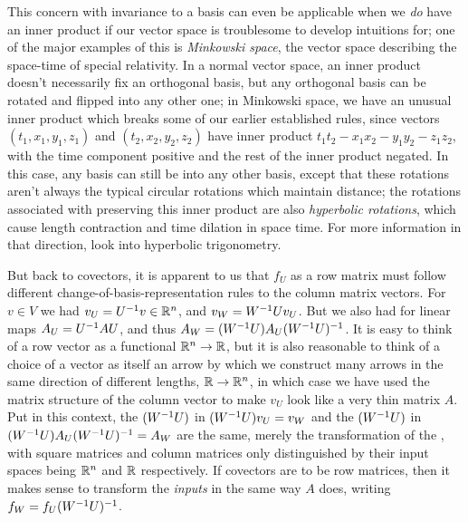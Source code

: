 \documentclass[11pt]{article}
\begin{document}
This concern with invariance to a basis can even be applicable when we \emph{do} have an inner product if our vector space is troublesome to develop intuitions for; one of the major examples of this is \emph{Minkowski space}, the vector space describing the space-time of special relativity. In a normal vector space, an inner product doesn't necessarily fix an orthogonal basis, but any orthogonal basis can be rotated and flipped into any other one; in Minkowski space, we have an unusual inner product which breaks some of our earlier established rules, since vectors $(t_1,x_1,y_1,z_1)$ and $(t_2,x_2,y_2,z_2)$ have inner product $t_1 t_2 - x_1 x_2 - y_1 y_2 - z_1 z_2$, with the time component positive and the rest of the inner product negated. In this case, any basis can still be  into any other basis, except that these rotations aren't always the typical circular rotations which maintain distance; the rotations associated with preserving this inner product are also \emph{hyperbolic rotations}, which cause length contraction and time dilation in space time. For more information in that direction, look into hyperbolic trigonometry.

But back to covectors, it is apparent to us that $f_U$ as a row matrix must follow different change-of-basis-representation rules to the column matrix vectors. For $v \in V$ we had $v_U = U^{-1} v \in \mathbb{R}^n$, and $v_W = W^{-1} U v_U$. But we also had for linear maps $A_U = U^{-1} A U$, and thus $A_W = (W^{-1} U) A_U (W^{-1} U)^{-1}$. It is easy to think of a row vector as a functional $\mathbb{R}^n \to \mathbb{R}$, but it is also reasonable to think of a choice of a vector as itself an arrow by which we construct many arrows in the same direction of different lengths, $\mathbb{R} \to \mathbb{R}^n$, in which case we have used the matrix structure of the column vector to make $v_U$ look like a very thin matrix $A$. Put in this context, the $(W^{-1} U)$ in $(W^{-1} U) v_U = v_W$ and the $(W^{-1} U)$ in $(W^{-1} U) A_U (W^{-1} U)^{-1} = A_W$ are the same, merely the transformation of the , with square matrices and column matrices only distinguished by their input spaces being $\mathbb{R}^n$ and $\mathbb{R}$ respectively. If covectors are to be row matrices, then it makes sense to transform the \emph{inputs} in the same way $A$ does, writing $f_W = f_U (W^{-1} U)^{-1}$.
\end{document}
